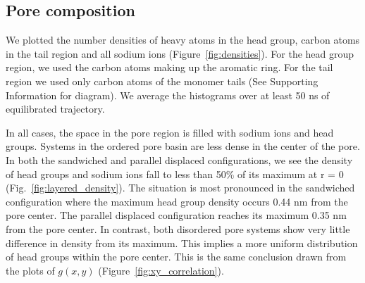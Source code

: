 \documentclass{article}
\begin{document}

  \subsection{Pore composition}
  
  We plotted the number densities of heavy atoms in the head group, carbon atoms in the tail
  region and all sodium ions (Figure~\ref{fig:densities}). For the head group
  region, we used the carbon atoms making up the aromatic ring. For the tail
  region we used only carbon atoms of the monomer tails (See Supporting
  Information for diagram). We average the histograms over at least 50 ns of
  equilibrated trajectory.
  
  In all cases, the space in the pore region is filled with sodium ions and
  head groups. Systems in the ordered pore basin are less dense in
  the center of the pore. In both the sandwiched and parallel displaced
  configurations, we see the density of head groups and sodium ions fall to less
  than 50\% of its maximum at r = 0 (Fig.~\ref{fig:layered_density}). The
  situation is most pronounced in the sandwiched configuration where the maximum
  head group density occurs 0.44 nm from the pore center. The parallel displaced
  configuration reaches its maximum 0.35 nm from the pore center. In contrast,
  both disordered pore systems show very little difference in density from its
  maximum. This implies a more uniform distribution of head groups within the
  pore center. This is the same conclusion drawn from the plots of $g(x,y)$ 
  (Figure~\ref{fig:xy_correlation}). 
\end{document}
